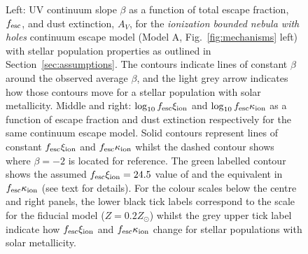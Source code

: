 \begin{landscape}
\begin{figure}
  \caption[UV continuum slope $\beta$, $\log_{10}f_{\rm{esc}}\xi_{\rm{ion}}$ and $\log_{10}f_{\rm{esc}}\kappa_{\rm{ion}}$ as a function of total escape fraction, $f_{\rm{esc}}$, and dust extinction, $A_{V}$, for the \emph{ionization bounded nebula with holes} continuum escape model.]{Left: UV continuum slope $\beta$ as a function of total escape fraction, $f_{\rm{esc}}$, and dust extinction, $A_{V}$, for the \emph{ionization bounded nebula with holes} continuum escape model (Model A, Fig.~\ref{fig:mechanisms} left) with stellar population properties as outlined in Section~\ref{sec:assumptions}. The contours indicate lines of constant $\beta$ around the observed average $\beta$, and the light grey arrow indicates how those contours move for a stellar population with solar metallicity. Middle and right: $\log_{10}f_{\rm{esc}}\xi_{\rm{ion}}$ and $\log_{10}f_{\rm{esc}}\kappa_{\rm{ion}}$ as a function of escape fraction and dust extinction respectively for the same continuum escape model. Solid contours represent lines of constant $f_{\rm{esc}}\xi_{\rm{ion}}$ and $f_{\rm{esc}}\kappa_{\rm{ion}}$ whilst the dashed contour shows where $\beta = -2$ is located for reference. The green labelled contour shows the assumed $f_{\rm{esc}}\xi_{\rm{ion}} = 24.5$ value of \citet{Robertson:2013ji} and the equivalent in $f_{\rm{esc}}\kappa_{\rm{ion}}$ (see text for details). For the colour scales below the centre and right panels, the lower black tick labels correspond to the scale for the fiducial model ($Z = 0.2 Z_{\odot}$) whilst the grey upper tick label indicate how $f_{\rm{esc}}\xi_{\rm{ion}}$ and $f_{\rm{esc}}\kappa_{\rm{ion}}$ change for stellar populations with solar metallicity.}
  \label{fig:fesc_cover}
\end{figure}


\end{landscape}
